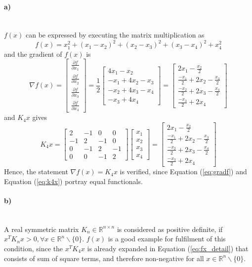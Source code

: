 \documentclass[a4paper]{article}
\newcommand{\R}{\mathbb{R}}
\newcommand*{\BMAT}[1]
{
	\begin{bmatrix}
		#1 
	\end{bmatrix}
}
\newcommand*{\EQ}[1]{Equation (\ref{eq:#1})}
\begin{document}
\paragraph{a)}\mbox{} \\
$f(x)$ can be expressed by executing the matrix multiplication as
\begin{equation}
	f(x)= x_1^2 + (x_1 - x_2)^2 + (x_2 - x_3)^2 + (x_3 - x_4)^2 + x_4^2
	\label{eq:fx_detail}
\end{equation}
and the gradient of $f(x)$ is
\begin{equation}
	\nabla f(x) = \BMAT{\frac{\partial f}{\partial x_1} \\
					   \frac{\partial f}{\partial x_2} \\
					   \frac{\partial f}{\partial x_3} \\
					   \frac{\partial f}{\partial x_4} }					   
				=\frac{1}{2} \BMAT{4x_1 - x_2\\
								   -x_1 + 4x_2 -x_3\\
								   -x_2 +4x_3 - x_4\\
								   -x_3 + 4x_4}
				= \BMAT{2 x_1 - \frac{x_2}{2} 				  \\
					    \frac{-x_1}{2}  + 2x_2 - \frac{x_3}{2}\\
					    \frac{-x_2}{2}  + 2x_3 - \frac{x_4}{2}\\
					    \frac{-x_3}{2}  + 2x_4}
					    \label{eq:gradf}
\end{equation}
and $K_4 x$ gives
\begin{equation}
	K_4 x = \BMAT{2 & -1 & 0 & 0\\
			     -1 & 2 & -1 & 0\\
				  0 & -1 & 2 & -1\\
				  0 & 0 & -1 & 2}
			\BMAT{x_1\\
			      x_2\\
				  x_3\\
				  x_4}
			= 
			\BMAT{2 x_1 - \frac{x_2}{2} 				  \\
	    	    \frac{-x_1}{2}  + 2x_2 - \frac{x_3}{2}\\
			    \frac{-x_2}{2}  + 2x_3 - \frac{x_4}{2}\\
			    \frac{-x_3}{2}  + 2x_4}
			    \label{eq:k4x}
\end{equation}
Hence, the statement $\nabla f(x) = K_4 x$ is verified, since \EQ{gradf} and \EQ{k4x} portray equal functionals. 
\paragraph{b)}\mbox{} \\
A real symmetric matrix $K_n \in \R^{n \times n}$ is considered as positive definite, if $x^T K_n x > 0, \forall x \in \R^n \backslash \{0\}$. $f(x)$ is a good example for fulfilment of this condition, since the $x^T K_4 x$ is already expanded in \EQ{fx_detail} that consists of sum of square terms, and therefore non-negative for all $x \in \R^n \backslash \{0\}$.
\end{document}
